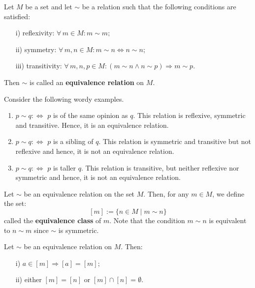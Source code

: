 \documentclass[root.tex]{subfiles}
\begin{document}
\begin{mydef}
Let $M$ be a set and let $\sim$ be a relation such that the following conditions are satisfied:
\begin{enumerate}
\item[i)] reflexivity: $\forall \, m \in M: m \sim m;$
\item[ii)] symmetry: $\forall \, m,n \in M: m \sim n \Leftrightarrow n \sim n;$
\item[iii)] transitivity: $\forall \, m,n,p \in M: (m \sim n \land n \sim p) \Rightarrow m \sim p.$
\end{enumerate}
Then $\sim$ is called an \textbf{equivalence relation} on $M$.
\end{mydef}

\begin{myex}
Consider the following wordy examples.
\begin{enumerate}[label=\alph*)]
\item $p\sim q :\Leftrightarrow $ $p$ is of the same opinion as $q$. This relation is reflexive, symmetric and transitive. Hence, it is an equivalence relation.
\item $p\sim q :\Leftrightarrow $ $p$ is a sibling of $q$. This relation is symmetric and transitive but not reflexive and hence, it is not an equivalence relation.
\item $p\sim q :\Leftrightarrow $ $p$ is taller $q$. This relation is transitive, but neither reflexive nor symmetric and hence, it is not an equivalence relation.
\end{enumerate}
\end{myex}

\begin{mydef}
Let $\sim$ be an equivalence relation on the set $M$. Then, for any $m \in M$, we define the set:
$$
[m] := \{n \in M \mid m \sim n\}
$$
called the \textbf{equivalence class} of $m$. Note that the condition $m \sim n$ is equivalent to $n \sim m$ since $\sim$ is symmetric.
\end{mydef}

\begin{proposition}
Let $\sim$ be an equivalence relation on $M$. Then:
\begin{enumerate}
\item[i)] $a \in [m] \Rightarrow [a]=[m]$;
\item[ii)] either $[m]=[n]$ or $[m] \cap [n] = \emptyset$.
\end{enumerate}
\end{proposition}
\end{document}
